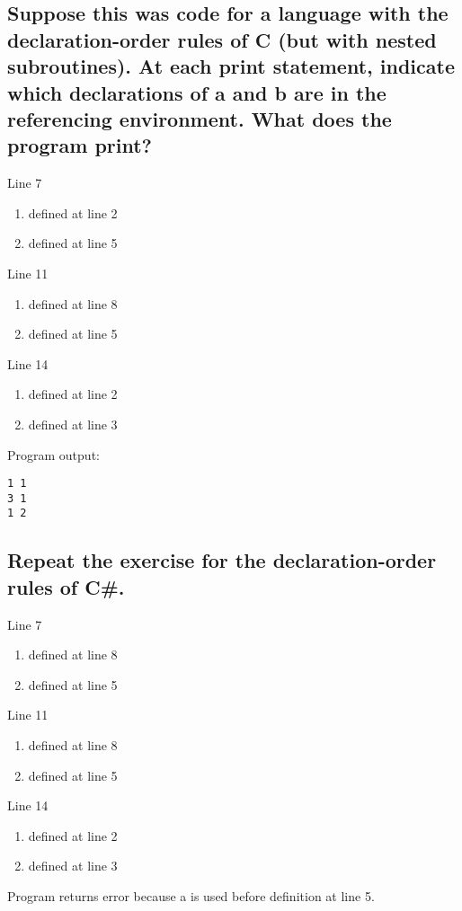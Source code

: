 \documentclass[letterpaper]{article}
\begin{document}
\subsection{Suppose this was code for a language with the declaration-order rules of C (but with nested subroutines). At each print statement, indicate which declarations of a and b are in the referencing environment. What does the program print?}
\begin{adjustwidth}{2.35em}{0pt}
Line 7
\begin{enumerate}[label=\alph*]
\item defined at line 2
\item defined at line 5
\end{enumerate}
Line 11
\begin{enumerate}[label=\alph*]
\item defined at line 8
\item defined at line 5
\end{enumerate}
Line 14
\begin{enumerate}[label=\alph*]
\item defined at line 2
\item defined at line 3
\end{enumerate}
Program output:
\begin{Verbatim}
1 1
3 1
1 2
\end{Verbatim}
\end{adjustwidth}
\subsection{Repeat the exercise for the declaration-order rules of C\#.}
\begin{adjustwidth}{2.35em}{0pt}
Line 7
\begin{enumerate}[label=\alph*]
\item defined at line 8
\item defined at line 5
\end{enumerate}
Line 11
\begin{enumerate}[label=\alph*]
\item defined at line 8
\item defined at line 5
\end{enumerate}
Line 14
\begin{enumerate}[label=\alph*]
\item defined at line 2
\item defined at line 3
\end{enumerate}
Program returns error because a is used before definition at line 5.
\end{adjustwidth}
\end{document}
